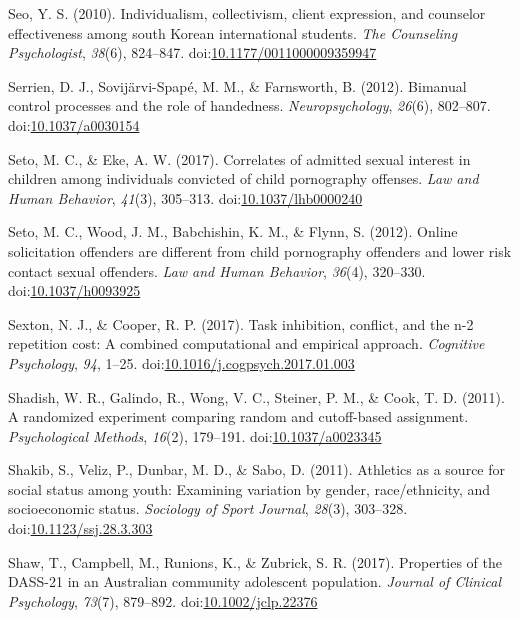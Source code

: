 \documentclass[english,man]{apa6}
\theoremstyle{definition}
\theoremstyle{definition}
\theoremstyle{definition}
\theoremstyle{remark}
\begin{document}
\hypertarget{ref-Seo2010}{}
Seo, Y. S. (2010). Individualism, collectivism, client expression, and
counselor effectiveness among south Korean international students.
\emph{The Counseling Psychologist}, \emph{38}(6), 824--847.
doi:\href{https://doi.org/10.1177/0011000009359947}{10.1177/0011000009359947}

\hypertarget{ref-Serrien2012}{}
Serrien, D. J., Sovijärvi-Spapé, M. M., \& Farnsworth, B. (2012).
Bimanual control processes and the role of handedness.
\emph{Neuropsychology}, \emph{26}(6), 802--807.
doi:\href{https://doi.org/10.1037/a0030154}{10.1037/a0030154}

\hypertarget{ref-Seto2017}{}
Seto, M. C., \& Eke, A. W. (2017). Correlates of admitted sexual
interest in children among individuals convicted of child pornography
offenses. \emph{Law and Human Behavior}, \emph{41}(3), 305--313.
doi:\href{https://doi.org/10.1037/lhb0000240}{10.1037/lhb0000240}

\hypertarget{ref-Seto2012}{}
Seto, M. C., Wood, J. M., Babchishin, K. M., \& Flynn, S. (2012). Online
solicitation offenders are different from child pornography offenders
and lower risk contact sexual offenders. \emph{Law and Human Behavior},
\emph{36}(4), 320--330.
doi:\href{https://doi.org/10.1037/h0093925}{10.1037/h0093925}

\hypertarget{ref-Sexton2017}{}
Sexton, N. J., \& Cooper, R. P. (2017). Task inhibition, conflict, and
the n-2 repetition cost: A combined computational and empirical
approach. \emph{Cognitive Psychology}, \emph{94}, 1--25.
doi:\href{https://doi.org/10.1016/j.cogpsych.2017.01.003}{10.1016/j.cogpsych.2017.01.003}

\hypertarget{ref-Shadish2011}{}
Shadish, W. R., Galindo, R., Wong, V. C., Steiner, P. M., \& Cook, T. D.
(2011). A randomized experiment comparing random and cutoff-based
assignment. \emph{Psychological Methods}, \emph{16}(2), 179--191.
doi:\href{https://doi.org/10.1037/a0023345}{10.1037/a0023345}

\hypertarget{ref-Shakib2011}{}
Shakib, S., Veliz, P., Dunbar, M. D., \& Sabo, D. (2011). Athletics as a
source for social status among youth: Examining variation by gender,
race/ethnicity, and socioeconomic status. \emph{Sociology of Sport
Journal}, \emph{28}(3), 303--328.
doi:\href{https://doi.org/10.1123/ssj.28.3.303}{10.1123/ssj.28.3.303}

\hypertarget{ref-Shaw2017}{}
Shaw, T., Campbell, M., Runions, K., \& Zubrick, S. R. (2017).
Properties of the DASS-21 in an Australian community adolescent
population. \emph{Journal of Clinical Psychology}, \emph{73}(7),
879--892.
doi:\href{https://doi.org/10.1002/jclp.22376}{10.1002/jclp.22376}
\end{document}
